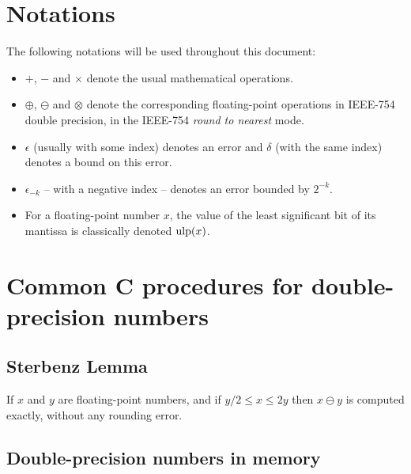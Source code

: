 
\section{Notations\label{section:notations}}


The following notations will be used throughout this document:
\begin{itemize}

\item  $+$, $-$ and  $\times$ denote the usual
mathematical operations.

\item $\oplus$, $\ominus$ and $\otimes$ denote the
corresponding floating-point operations in IEEE-754 double precision,
in the IEEE-754 \emph{round to nearest} mode.

\item $\epsilon$ (usually with some index) denotes an error and
  $\delta$ (with the same index) denotes a bound on this error.

\item $\epsilon_{-k}$ -- with a negative index -- denotes an error bounded by $2^{-k}$.
  
\item For a floating-point number $x$, the value of the least
  significant bit of its mantissa is classically denoted $\mbox{ulp}(x)$.

\end{itemize}




\section{Common C procedures  for double-precision numbers\label{section:commonCdouble}}

\subsection{Sterbenz Lemma}

\begin{theorem}
\label{sterbenz}
If $x$ and $y$ are floating-point numbers, and if ${y}/{2} \leq x \leq 2y$ then $x\ominus y$ is computed exactly, without any rounding error.
\end{theorem}


\subsection{Double-precision numbers in memory\label{section:memory}}

